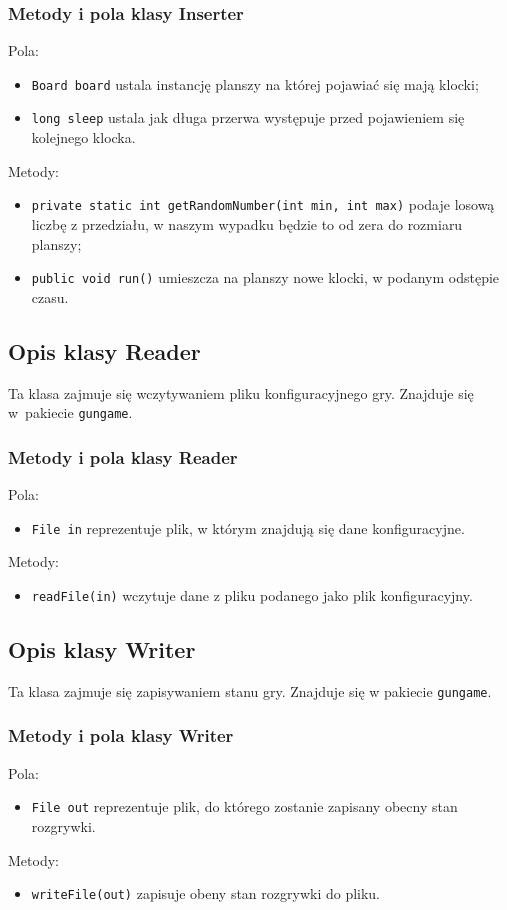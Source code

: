 \documentclass[12pt]{report}
\newcommand{\code}[1]{\texttt{#1}}
\begin{document}
\subsubsection{Metody i pola klasy Inserter}
Pola:
\begin{itemize}
    \item \code{Board board} ustala instancję planszy na której pojawiać się mają klocki;
    \item \code{long sleep} ustala jak długa przerwa występuje przed pojawieniem się kolejnego klocka.
\end{itemize}
Metody:
\begin{itemize}
    \item \code{private static int getRandomNumber(int min, int max)} podaje losową liczbę z przedziału, w naszym wypadku będzie to od zera do rozmiaru planszy;
    \item \code{public void run()} umieszcza na planszy nowe klocki, w podanym odstępie czasu.
\end{itemize}



\subsection{Opis klasy Reader}
Ta klasa zajmuje się wczytywaniem pliku konfiguracyjnego gry. Znajduje się w~pakiecie \code{gungame}.
\subsubsection{Metody i pola klasy Reader}
Pola:
\begin{itemize}
    \item \code{File in} reprezentuje plik, w którym znajdują się dane konfiguracyjne.
\end{itemize}
Metody:
\begin{itemize}
    \item \code{readFile(in)} wczytuje dane z pliku podanego jako plik konfiguracyjny.
\end{itemize}
\subsection{Opis klasy Writer}
Ta klasa zajmuje się zapisywaniem stanu gry. Znajduje się w pakiecie \code{gungame}.
\subsubsection{Metody i pola klasy Writer}
Pola:
\begin{itemize}
    \item \code{File out} reprezentuje plik, do którego zostanie zapisany obecny stan rozgrywki.
\end{itemize}
Metody:
\begin{itemize}
    \item \code{writeFile(out)} zapisuje obeny stan rozgrywki do pliku.
\end{itemize}
\end{document}
